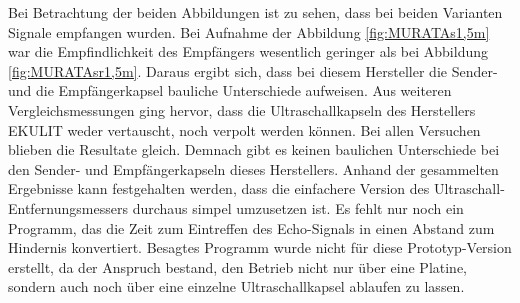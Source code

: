 Bei Betrachtung der beiden Abbildungen ist zu sehen, dass bei beiden Varianten Signale empfangen wurden. Bei Aufnahme der Abbildung \ref{fig:MURATAs1,5m} war die Empfindlichkeit des Empfängers wesentlich geringer als bei Abbildung \ref{fig:MURATAsr1,5m}. Daraus ergibt sich, dass bei diesem Hersteller die Sender- und die Empfängerkapsel bauliche Unterschiede aufweisen. Aus weiteren Vergleichsmessungen ging hervor, dass die Ultraschallkapseln des Herstellers EKULIT weder vertauscht, noch verpolt werden können. Bei allen Versuchen blieben die Resultate gleich. Demnach gibt es keinen baulichen Unterschiede bei den Sender- und Empfängerkapseln dieses Herstellers.
Anhand der gesammelten Ergebnisse kann festgehalten werden, dass die einfachere Version des Ultraschall-Entfernungsmessers durchaus simpel umzusetzen ist. Es fehlt nur noch ein Programm, das die Zeit zum Eintreffen des Echo-Signals in einen Abstand zum Hindernis konvertiert. Besagtes Programm wurde nicht für diese Prototyp-Version erstellt, da der Anspruch bestand, den Betrieb nicht nur über eine Platine, sondern auch noch über eine einzelne Ultraschallkapsel ablaufen zu lassen.
\newpage
